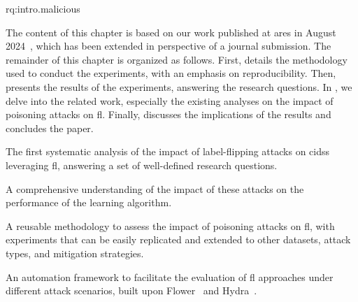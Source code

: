 \begin{subquestions}{rq:intro.malicious}
  \item \rqpred \label{rq:assess.predictability}
  \item \rqparams \label{rq:assess.hyperparams}
  \item \rqbackdoor \label{rq:assess.backdoors}
  \item \rqthreshold \label{rq:assess.threshold}
  \item \rqsim \label{rq:assess.similarity}
\end{subquestions}

The content of this chapter is based on our work published at \gls{ares} in August 2024~\cite{lavaur_ares_bass_2024}, which has been extended in perspective of a journal submission.
The remainder of this chapter is organized as follows.
First,  details the methodology used to conduct the experiments, with an emphasis on reproducibility.
Then,  presents the results of the experiments, answering the research questions.
In , we delve into the related work, especially the existing analyses on the impact of poisoning attacks on \gls{fl}.
Finally,  discusses the implications of the results and concludes the paper.


\begin{contribs}
  \item The first systematic analysis of the impact of label-flipping attacks on \glspl{cids} leveraging \gls{fl}, answering a set of well-defined research questions.
  \item A comprehensive understanding of the impact of these attacks on the performance of the learning algorithm.
  \item A reusable methodology to assess the impact of poisoning attacks on \gls{fl}, with experiments that can be easily replicated and extended to other datasets, attack types, and mitigation strategies.
  \item An automation framework to facilitate the evaluation of \gls{fl} approaches under different attack scenarios, built upon Flower~\cite{beutel_Flowerfriendlyfederated_2020} and Hydra~\cite{Hydra}.
\end{contribs}